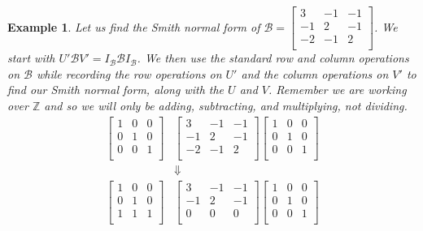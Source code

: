 \documentclass[11pt]{amsart}
\theoremstyle{plain}
\newtheorem{exa}{Example}
\theoremstyle{definition}
\begin{document}
\begin{exa}
  Let us find the Smith normal form of
  $
  \mathcal{B}=\left[\begin{array}{rrr}
  3&-1&-1\\
  -1&2&-1\\
  -2&-1&2\\
  \end{array}\right]
  $. We start with $U'\mathcal{B}V'=I_\mathcal{B}\mathcal{B}I_\mathcal{B}$. We then use the standard row and column
  operations on $\mathcal{B}$ while recording the row operations on $U'$ and the
  column operations on $V'$ to find our Smith normal form, along with the
  $U$ and $V$. Remember we are working over $\mathbb{Z}$ and so we will only be adding, subtracting, and multiplying, not dividing.
  \begin{align*}
  \left[\begin{array}{rrr}
  1&0&0\\
  0&1&0\\
  0&0&1\\
  \end{array}\right]
  &
  \left[\begin{array}{rrr}
  3&-1&-1\\
  -1&2&-1\\
  -2&-1&2\\
  \end{array}\right]
  \left[\begin{array}{rrr}
  1&0&0\\
  0&1&0\\
  0&0&1\\
  \end{array}\right]\\
  &\Downarrow\\
  \left[\begin{array}{rrr}
  1&0&0\\
  0&1&0\\
  1&1&1\\
  \end{array}\right]
  &
  \left[\begin{array}{rrr}
  3&-1&-1\\
  -1&2&-1\\
  0&0&0\\
  \end{array}\right]
  \left[\begin{array}{rrr}
  1&0&0\\
  0&1&0\\
  0&0&1\\
  \end{array}\right]\\

\end{align*}
\end{exa}
\end{document}
